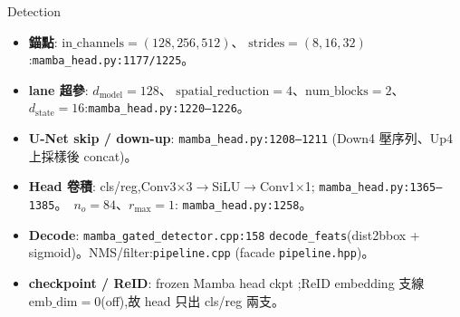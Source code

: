 \begin{implsupp}{Detection}
\begin{itemize}
\setlength\itemsep{1pt}
\item \textbf{錨點}: \(\mathrm{in\_channels}{=}(128,256,512)\)、
\(\mathrm{strides}{=}(8,16,32)\):\texttt{mamba\_head.py:1177/1225}。
\item \textbf{lane 超參}: \(d_{\mathrm{model}}{=}128\)、
\(\mathrm{spatial\_reduction}{=}4\)、\(\mathrm{num\_blocks}{=}2\)、
\(d_{\mathrm{state}}{=}16\):\texttt{mamba\_head.py:1220--1226}。
\item \textbf{U-Net skip / down-up}: \texttt{mamba\_head.py:1208--1211}
(Down4 壓序列、Up4 上採樣後 concat)。
\item \textbf{Head 卷積}: cls/reg,Conv3\(\times\)3\(\to\)SiLU\(\to\)Conv1\(\times\)1;
\texttt{mamba\_head.py:1365--1385}。\ \(n_o{=}84\)、\(r_{\max}{=}1\):
\texttt{mamba\_head.py:1258}。
\item \textbf{Decode}: \texttt{mamba\_gated\_detector.cpp:158}
\texttt{decode\_feats}(dist2bbox + sigmoid)。NMS/filter:\texttt{pipeline.cpp}
(facade \texttt{pipeline.hpp})。
\item \textbf{checkpoint / ReID}: frozen Mamba head ckpt
;ReID embedding 支線
\(\mathrm{emb\_dim}{=}0\)(off),故 head 只出 cls/reg 兩支。
\end{itemize}
\end{implsupp}
